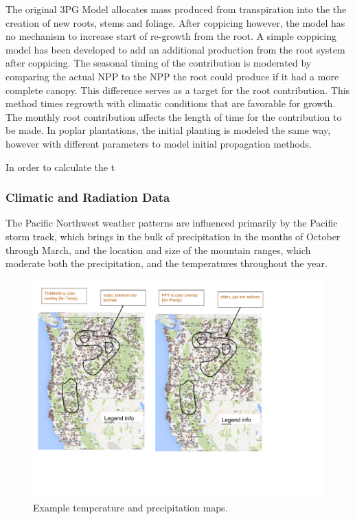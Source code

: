 \documentclass[preprint,12pt]{elsarticle}
\begin{document}
The original 3PG Model allocates mass produced from transpiration into
the the creation of new roots, stems and foliage.  After coppicing
however, the model has no mechanism to increase start of re-growth
from the root.  A simple coppicing model has been developed to add an
additional production from the root system after
coppicing\cite{hart14-coppice}.  The seasonal timing of the
contribution is moderated by comparing the actual NPP to the NPP the
root could produce if it had a more complete canopy.  This difference
serves as a target for the root contribution.  This method times
regrowth with climatic conditions that are favorable for growth.  The
monthly root contribution affects the length of time for the
contribution to be made.  In poplar plantations, the initial planting
is modeled the same way, however with different parameters to model
initial propagation methods.

In order to calculate the t

\subsubsection{Climatic and Radiation Data}
\label{sec:climate}


The Pacific Northwest weather patterns are influenced primarily by the
Pacific storm track, which brings in the bulk of precipitation in the
months of October through March, and the location and size of the
mountain ranges, which moderate both the precipitation, and the
temperatures throughout the year.


\begin{figure}[hp]
  \centering
  \includegraphics[width=1.0\linewidth]{hart14poplar-model-weather}  
  \caption{Example temperature and precipitation maps.}
  \label{fig:temp}
\end{figure}
\end{document}
